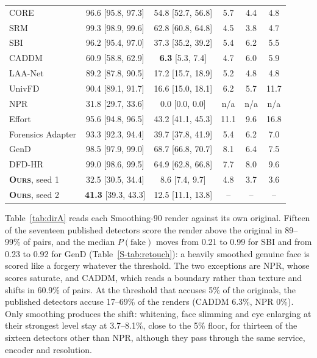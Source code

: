 \documentclass[conference]{IEEEtran}
\newcommand{\ours}{\textsc{Ours}}
\begin{document}
\begin{table}[t]
\begin{tabular}{@{}l cc ccc@{}}
CORE & 96.6 [95.8, 97.3] & 54.8 [52.7, 56.8] & 5.7 & 4.4 & 4.8 \\
SRM & 99.3 [98.9, 99.6] & 62.8 [60.8, 64.8] & 4.5 & 3.8 & 4.7 \\
SBI & 96.2 [95.4, 97.0] & 37.3 [35.2, 39.2] & 5.4 & 6.2 & 5.5 \\
CADDM & 60.9 [58.8, 62.9] & \textbf{6.3} [5.3, 7.4] & 4.7 & 6.0 & 5.9 \\
LAA-Net & 89.2 [87.8, 90.5] & 17.2 [15.7, 18.9] & 5.2 & 4.8 & 4.8 \\
UnivFD & 90.4 [89.1, 91.7] & 16.6 [15.0, 18.1] & 6.2 & 5.7 & 11.7 \\
NPR & 31.8 [29.7, 33.6] & 0.0 [0.0, 0.0] & n/a & n/a & n/a \\
Effort & 95.6 [94.8, 96.5] & 43.2 [41.1, 45.3] & 11.1 & 9.6 & 16.8 \\
Forensics Adapter & 93.3 [92.3, 94.4] & 39.7 [37.8, 41.9] & 5.4 & 6.2 & 7.0 \\
GenD & 98.5 [97.9, 99.0] & 68.7 [66.8, 70.7] & 8.1 & 6.4 & 7.5 \\
DFD-HR & 99.0 [98.6, 99.5] & 64.9 [62.8, 66.8] & 7.7 & 8.0 & 9.6 \\
\midrule
\textbf{\ours{}}, seed 1 & 32.5 [30.5, 34.4] & 8.6 [7.4, 9.7] & 4.8 & 3.7 & 3.6 \\
\textbf{\ours{}}, seed 2 & \textbf{41.3} [39.3, 43.3] & 12.5 [11.1, 13.8] & -- & -- & -- \\
\bottomrule
\end{tabular}
\end{table}

Table~\ref{tab:dirA} reads each Smoothing-90 render against its own original. Fifteen of the seventeen published detectors
score the render above the original in 89--99\% of pairs, and the median $P(\text{fake})$ moves from 0.21 to 0.99 for SBI
and from 0.23 to 0.92 for GenD (Table~\ref{S-tab:retouch}):
a heavily smoothed genuine face is scored like a forgery whatever the threshold. The two exceptions are NPR, whose scores
saturate, and CADDM, which reads a boundary rather than texture and shifts in 60.9\% of pairs. At the threshold that accuses
5\% of the originals, the published detectors accuse 17--69\% of the renders (CADDM 6.3\%, NPR 0\%).
Only smoothing produces the shift: whitening, face slimming and eye enlarging at their strongest level stay at 3.7--8.1\%, close to the 5\% floor, for thirteen of the sixteen detectors other than NPR,
although they pass through the same service, encoder and resolution.
\end{document}
